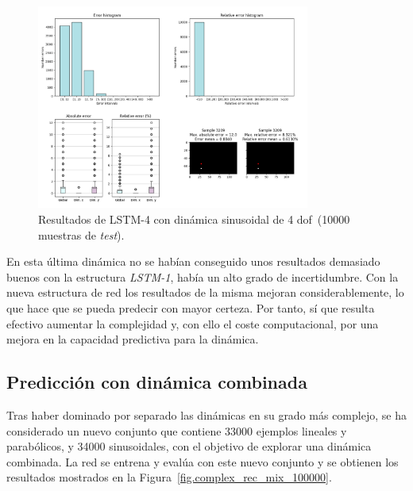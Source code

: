 \begin{figure}[H]
		\begin{center}
			\includegraphics[width=0.8\textwidth]{ figures/test_mod/REC/complex/layers_sin_var2_100000.png}
			\caption{Resultados de LSTM-4 con dinámica sinusoidal de 4 \acrshort{dof}~(10000 muestras de \textit{test}).} 
			\label{fig.complex_rec_sin_var2_100000}
		\end{center}
\end{figure}
\vspace{-10pt}

En esta última dinámica no se habían conseguido unos resultados demasiado buenos con la estructura \textit{LSTM-1}, había un alto grado de incertidumbre. Con la nueva estructura de red los resultados de la misma mejoran considerablemente, lo que hace que se pueda predecir con mayor certeza. Por tanto, sí que resulta efectivo aumentar la complejidad y, con ello el coste computacional, por una mejora en la capacidad predictiva para la dinámica.

\subsection{Predicción con dinámica combinada}
Tras haber dominado por separado las dinámicas en su grado más complejo, se ha considerado un nuevo conjunto que contiene 33000 ejemplos lineales y parabólicos, y 34000 sinusoidales, con el objetivo de explorar una dinámica combinada. La red se entrena y evalúa con este nuevo conjunto y se obtienen los resultados mostrados en la Figura~\ref{fig.complex_rec_mix_100000}.

